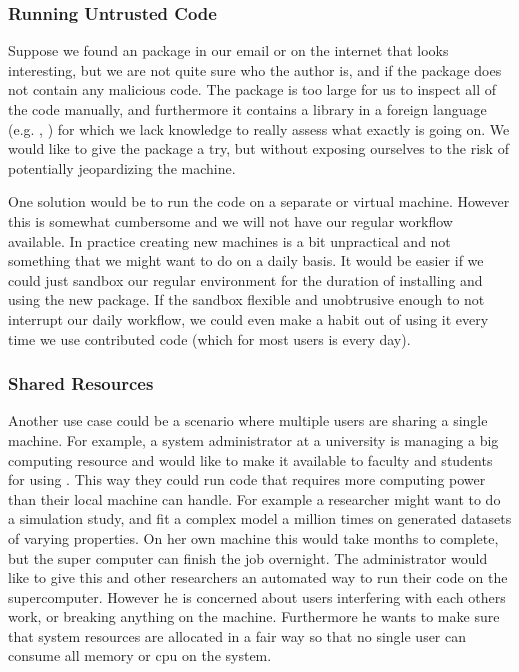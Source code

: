 \documentclass[article]{jss}
\begin{document}
\subsubsection{Running Untrusted Code}

Suppose we found an  package in our email or on the internet that
looks interesting, but we are not quite sure who the author is, and if the
package does not contain any malicious code. The package is too large for us to
inspect all of the code manually, and furthermore it contains a library in a
foreign language (e.g. , ) for which we lack
knowledge to really assess what exactly is going on. We would like to give the
package a try, but without exposing ourselves to the risk of potentially
jeopardizing the machine.

One solution would be to run the code on a separate or virtual machine. However
this is somewhat cumbersome and we will not have our regular workflow available.
In practice creating new machines is a bit unpractical and not something that we
might want to do on a daily basis. It would be easier if we could just sandbox
our regular  environment for the duration of installing and using
the new package. If the sandbox flexible and unobtrusive enough to not interrupt
our daily workflow, we could even make a habit out of using it every time we use
contributed code (which for most users is every day).


\subsubsection{Shared Resources}

Another use case could be a scenario where multiple users are sharing a single
machine. For example, a system administrator at a university is managing a big
computing resource and would like to make it available to faculty and students
for using . This way they could run  code that requires
more computing power than their local machine can handle. For example a
researcher might want to do a simulation study, and fit a complex model a
million times on generated datasets of varying properties. On her own machine
this would take months to complete, but the super computer can finish the job
overnight. The administrator would like to give this and other researchers an
automated way to run their  code on the supercomputer. However he is
concerned about users interfering with each others work, or breaking anything
on the machine. Furthermore he wants to make sure that system resources are
allocated in a fair way so that no single user can consume all memory or cpu
on the system.
\end{document}
